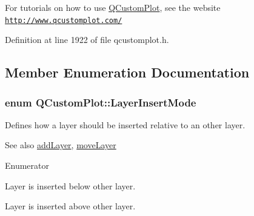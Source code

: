 For tutorials on how to use \hyperlink{class_q_custom_plot}{Q\+Custom\+Plot}, see the website~\newline
\href{http://www.qcustomplot.com/}{\tt http\+://www.\+qcustomplot.\+com/} 

Definition at line 1922 of file qcustomplot.\+h.



\subsection{Member Enumeration Documentation}
\hypertarget{class_q_custom_plot_a75a8afbe6ef333b1f3d47abb25b9add7}{}
\subsubsection[{Layer\+Insert\+Mode}]{\setlength{\rightskip}{0pt plus 5cm}enum {\bf Q\+Custom\+Plot\+::\+Layer\+Insert\+Mode}}\label{class_q_custom_plot_a75a8afbe6ef333b1f3d47abb25b9add7}
Defines how a layer should be inserted relative to an other layer.

\begin{DoxySeeAlso}{See also}
\hyperlink{class_q_custom_plot_ad5255393df078448bb6ac83fa5db5f52}{add\+Layer}, \hyperlink{class_q_custom_plot_ae896140beff19424e9e9e02d6e331104}{move\+Layer} 
\end{DoxySeeAlso}
\begin{Desc}
\item[Enumerator]\par
\begin{description}
\item[{\em 
\hypertarget{class_q_custom_plot_a75a8afbe6ef333b1f3d47abb25b9add7aee39cf650cd24e68552da0b697ce4a93}{}lim\+Below\label{class_q_custom_plot_a75a8afbe6ef333b1f3d47abb25b9add7aee39cf650cd24e68552da0b697ce4a93}
}]Layer is inserted below other layer. \item[{\em 
\hypertarget{class_q_custom_plot_a75a8afbe6ef333b1f3d47abb25b9add7a062b0b7825650b432a713c0df6742d41}{}lim\+Above\label{class_q_custom_plot_a75a8afbe6ef333b1f3d47abb25b9add7a062b0b7825650b432a713c0df6742d41}
}]Layer is inserted above other layer. \end{description}
\end{Desc}


